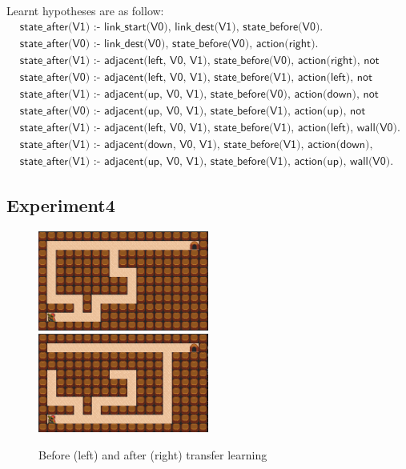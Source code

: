 Learnt hypotheses are as follow:
\begin{equation*}
\begin{split}
&\textsf{state\_after(V1) :- link\_start(V0), link\_dest(V1), state\_before(V0).}\\
&\textsf{state\_after(V0) :- link\_dest(V0), state\_before(V0), action(right).}\\
&\textsf{state\_after(V1) :- adjacent(left, V0, V1), state\_before(V0), action(right), not wall(V1).}\\
&\textsf{state\_after(V0) :- adjacent(left, V0, V1), state\_before(V1), action(left), not wall(V0).}\\
&\textsf{state\_after(V1) :- adjacent(up, V0, V1), state\_before(V0), action(down), not wall(V1).}\\
&\textsf{state\_after(V0) :- adjacent(up, V0, V1), state\_before(V1), action(up), not wall(V0).}\\
&\textsf{state\_after(V1) :- adjacent(left, V0, V1), state\_before(V1), action(left), wall(V0).}\\
&\textsf{state\_after(V1) :- adjacent(down, V0, V1), state\_before(V1), action(down), wall(V0).}\\
&\textsf{state\_after(V1) :- adjacent(up, V0, V1), state\_before(V1), action(up), wall(V0).}
\end{split}
\end{equation*}

\newpage

\subsection{Experiment4}

\begin{figure}[!htb]
\centerline{
\includegraphics[width=0.5\textwidth]{./figures/experiment4_before}
\includegraphics[width=0.5\textwidth]{./figures/experiment4_after}
}
\caption{Before (left) and after (right) transfer learning}
\label{experiment4}
\end{figure}    

